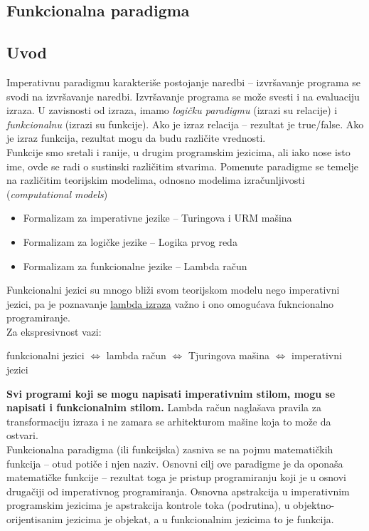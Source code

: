 \documentclass[../main.tex]{subfiles}
\begin{document}
\begin{boxnaslovi}
\section{Funkcionalna paradigma}											%
\end{boxnaslovi}

\subsection{Uvod}														%

Imperativnu paradigmu karakteriše postojanje naredbi -- izvršavanje programa se svodi na izvršavanje naredbi. Izvršavanje programa se može svesti i na evaluaciju izraza. U zavisnosti od izraza, imamo {\it logičku paradigmu} (izrazi su relacije) i {\it funkcionalnu} (izrazi su funkcije). Ako je izraz relacija -- rezultat je true/false. Ako je izraz funkcija, rezultat mogu da budu različite vrednosti.
\\
Funkcije smo sretali i ranije, u drugim programskim jezicima, ali iako nose isto ime, ovde se radi o sustinski različitim stvarima. Pomenute paradigme se temelje na različitim teorijskim modelima, odnosno modelima izračunljivosti ({\it computational models})
\begin{itemize}
\item Formalizam za imperativne jezike -- Turingova i URM mašina
\item Formalizam za logičke jezike -- Logika prvog reda
\item Formalizam za funkcionalne jezike -- Lambda račun
\end{itemize}
Funkcionalni jezici su mnogo bliži svom teorijskom modelu nego imperativni jezici, pa je poznavanje \underline{lambda izraza} važno i ono omogućava fukncionalno programiranje.\\
Za ekspresivnost vazi:
\begin{center}
funkcionalni jezici $\Leftrightarrow$ lambda račun $\Leftrightarrow$ Tjuringova mašina $\Leftrightarrow$ imperativni jezici
\end{center}
{\bf Svi programi koji se mogu napisati imperativnim stilom, mogu se napisati i funkcionalnim stilom.}
Lambda račun naglašava pravila za transformaciju izraza i ne zamara se arhitekturom mašine koja to može da ostvari.
\\
Funkcionalna paradigma (ili funkcijska) zasniva se na pojmu matematičkih funkcija -- otud potiče i njen naziv. Osnovni cilj ove paradigme je da oponaša matematičke funkcije -- rezultat toga je pristup programiranju koji je u osnovi drugačiji od imperativnog programiranja. Osnovna apstrakcija u imperativnim programskim jezicima je apstrakcija kontrole toka (podrutina), u objektno-orijentisanim jezicima je objekat, a u funkcionalnim jezicima to je funkcija.
\end{document}
